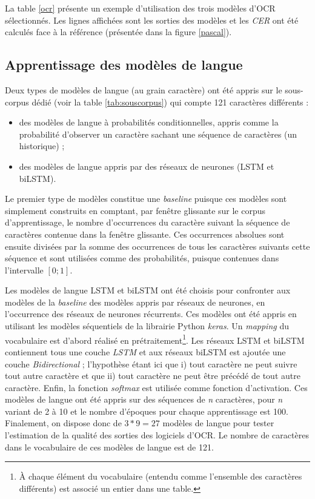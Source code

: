\documentclass[10pt,twoside]{article}
\begin{document}
    La table \ref{ocr} présente un exemple d'utilisation des trois modèles d'OCR sélectionnés. Les lignes affichées sont les sorties des modèles et les \textit{CER}
    ont été calculés face à la référence (présentée dans la figure \ref{pascal}).

    \subsection{Apprentissage des modèles de langue}
    Deux types de modèles de langue (au grain caractère) ont été appris sur le sous-corpus dédié (voir la table \ref{tab:souscorpus})
    qui compte 121 caractères différents :
    \begin{itemize}
      \item des modèles de langue à probabilités conditionnelles, appris comme la probabilité d'observer un caractère 
      sachant une séquence de caractères (un historique) ;
      \item des modèles de langue appris par des réseaux de neurones (LSTM et biLSTM).
    \end{itemize}
    Le premier type de modèles constitue une \textit{baseline} puisque ces modèles sont simplement construits en comptant, 
    par fenêtre glissante sur le corpus d'apprentissage, le nombre d'occurrences du caractère suivant
    la séquence de caractères contenue dans la fenêtre glissante. Ces occurrences absolues sont ensuite 
    divisées par la somme des occurrences de tous les caractères suivants cette séquence et sont utilisées
    comme des probabilités, puisque contenues dans l'intervalle $\left[0;1\right]$. 

    Les modèles de langue LSTM et biLSTM ont été choisis pour confronter aux modèles de la \textit{baseline} 
    des modèles appris par réseaux de neurones, en l'occurrence des réseaux de neurones récurrents. 
    Ces modèles ont été appris en utilisant les modèles séquentiels de la librairie Python \textit{keras}. Un \textit{mapping} du vocabulaire
    est d'abord réalisé en prétraitement\footnote{\`{A} chaque élément du vocabulaire (entendu comme l'ensemble des caractères 
    différents) est associé un entier dans une table.}. Les réseaux LSTM et biLSTM contiennent tous une couche 
    \textit{LSTM} et aux réseaux biLSTM est ajoutée une couche \textit{Bidirectional} ; l'hypothèse étant ici que
    i) tout caractère ne peut suivre tout autre caractère et que
    ii) tout caractère ne peut être précédé de tout autre caractère.
    Enfin, la fonction \textit{softmax} est utilisée comme fonction d'activation. Ces modèles de langue ont été appris sur des séquences de \textit{n} 
    caractères, pour \textit{n} variant de 2 à 10 et le nombre d'époques pour chaque apprentissage est 100. 
    Finalement, on dispose donc de $3 * 9 = 27$ modèles de langue
    pour tester l'estimation de la qualité des sorties des logiciels d'OCR. Le nombre de caractères dans le vocabulaire de ces
    modèles de langue est de 121.
\end{document}

